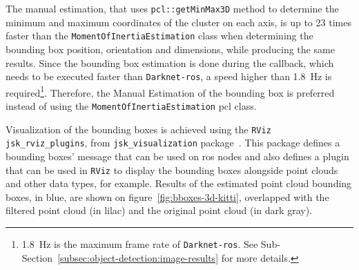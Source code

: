 The manual estimation, that uses \texttt{pcl::getMinMax3D} method to determine the minimum and maximum coordinates of the cluster on each axis, is up to 23 times faster than the \texttt{MomentOfInertiaEstimation} class when determining the bounding box position, orientation and dimensions, while producing the same results. Since the bounding box estimation is done during the callback, which needs to be executed faster than \texttt{Darknet-ros}, a speed higher than \SI{1.8}{\hertz} is required\footnote{\SI{1.8}{\hertz} is the maximum frame rate of \texttt{Darknet-ros}. See Sub-Section~\ref{subsec:object-detection:image-results} for more details.}. Therefore, the Manual Estimation of the bounding box is preferred instead of using the \texttt{MomentOfInertiaEstimation} \ac{pcl} class.

Visualization of the bounding boxes is achieved using the \texttt{RViz} \texttt{jsk\_rviz\_plugins}, from \texttt{jsk\_visualization} package~\cite{jsk_visualization}. This package defines a bounding boxes' message that can be used on \ac{ros} nodes and also defines a plugin that can be used in \texttt{RViz} to display the bounding boxes alongside point clouds and other data types, for example. Results of the estimated point cloud bounding boxes, in blue, are shown on figure~\ref{fig:bboxes-3d-kitti}, overlapped with the filtered point cloud (in lilac) and the original point cloud (in dark gray).


